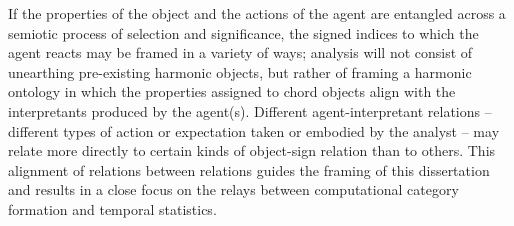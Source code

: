 If the properties of the object and the actions of the agent are entangled across a semiotic process of selection and significance, the signed indices to which the agent reacts may be framed in a variety of ways; analysis will not consist of unearthing pre-existing harmonic objects, but rather of framing a harmonic ontology in which the properties assigned to chord objects align with the interpretants produced by the agent(s).  Different agent-interpretant relations -- different types of action or expectation taken or embodied by the analyst -- may relate more directly to certain kinds of object-sign relation than to others.  This alignment of relations between relations guides the framing of this dissertation and results in a close focus on the relays between computational category formation and temporal statistics.

